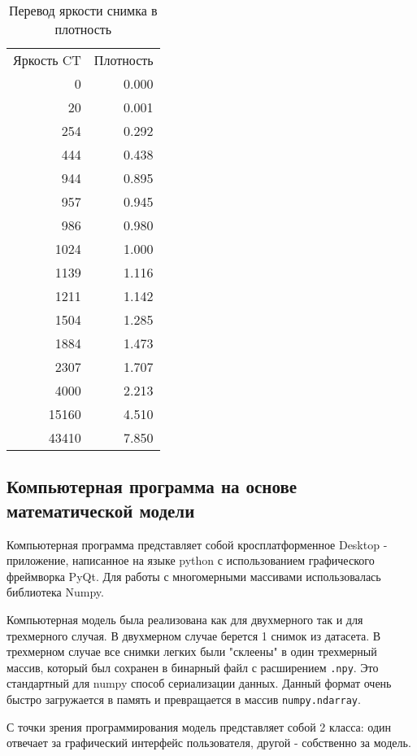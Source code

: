 \documentclass[../main.tex]{subfiles}
\begin{document}
\begin{table}[h]

\begin{center}
\caption{Перевод яркости снимка в плотность}
\begin{tabular}{ |r|r| } 
 \hline
 Яркость CT & Плотность \\
 0     & 0.000 \\
 20    & 0.001 \\
 254   & 0.292 \\
 444   & 0.438 \\
 944   & 0.895 \\
 957   & 0.945 \\
 986   & 0.980 \\
 1024  & 1.000 \\
 1139  & 1.116 \\
 1211  & 1.142 \\
 1504  & 1.285 \\
 1884  & 1.473 \\
 2307  & 1.707 \\
 4000  & 2.213 \\
 15160 & 4.510 \\
 43410 & 7.850 \\
 \hline
\end{tabular}
\end{center}
\end{table}


\subsection{Компьютерная программа на основе математической модели}
Компьютерная программа представляет собой кросплатформенное Desktop - приложение, написанное на языке python с использованием графического фреймворка PyQt. Для работы с многомерными массивами использовалась библиотека Numpy.

Компьютерная модель была реализована как для двухмерного так и для трехмерного случая. В двухмерном случае берется 1 снимок из датасета. В трехмерном случае все снимки легких были "склеены" в один трехмерный массив, который был сохранен в бинарный файл с расширением \texttt{.npy}. Это стандартный для numpy способ сериализации данных. Данный формат очень быстро загружается в память и превращается в массив \texttt{numpy.ndarray}.

С точки зрения программирования модель представляет собой 2 класса: один отвечает за графический интерфейс пользователя, другой - собственно за модель.
\end{document}
